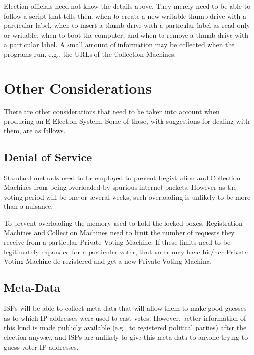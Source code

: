 \documentclass[12pt]{article}
\begin{document}
Election officials need not know the details above.
They merely need to be able to follow a script that tells
them when to create a new writable thumb drive with a particular
label, when to insert a thumb drive with a particular label
as read-only or writable, when to boot the computer,
and when to remove a thumb drive with a particular label.
A small amount of information may be collected when the programs run,
e.g., the URLs of the Collection Machines.


\section{Other Considerations}

There are other considerations that need to be taken into
account when producing an E-Election System.  Some of these,
with suggestions for dealing with them, are as follows.

\subsection{Denial of Service}

Standard methods need to be employed to prevent Registration and
Collection Machines from being overloaded by spurious internet packets.
However as the voting period will be one or several weeks, such
overloading is unlikely to be more than a nuisance.

To prevent overloading the memory used to hold the locked boxes,
Registration Machines and Collection Machines need to limit the
number of requests they receive from a particular Private Voting Machine.
If these limits need to be legitimately expanded for a particular
voter, that voter may have his/her Private Voting Machine de-registered
and get a new Private Voting Machine.

\subsection{Meta-Data}

ISPs will be able to collect meta-data that will allow them to
make good guesses as to which IP addresses were used to cast votes.
However, better information of this kind is made publicly available
(e.g., to registered political parties) after the election anyway,
and ISPs are unlikely to give this meta-data to anyone trying to
guess voter IP addresses.
\end{document}
